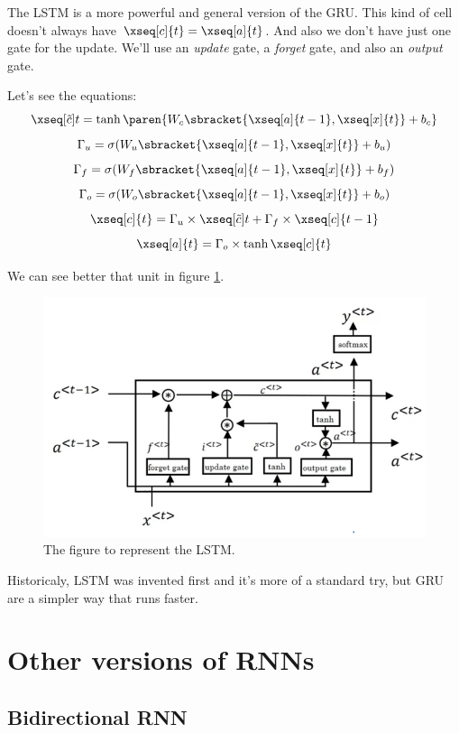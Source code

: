 \documentclass[12pt, a4paper, oneside]{book}
\begin{document}
The LSTM is a more powerful and general version of the GRU. This kind of cell
doesn't always have $\xseq[c]{t}=\xseq[a]{t}$. And also we don't have just one
gate for the update. We'll use an \textit{update} gate, a \textit{forget} gate,
and also an \textit{output} gate.

Let's see the equations:
\[
\xseq[\tilde{c}]{t}=\tanh\paren{W_{c}\sbracket{\xseq[a]{t-1},\xseq[x]{t}}+b_c}
\]
\[
\Gamma_u=\sigma(W_u\sbracket{\xseq[a]{t-1},\xseq[x]{t}}+b_u)
\]
\[
\Gamma_f=\sigma(W_f\sbracket{\xseq[a]{t-1},\xseq[x]{t}}+b_f)
\]
\[
\Gamma_o=\sigma(W_o\sbracket{\xseq[a]{t-1},\xseq[x]{t}}+b_o)
\]
\[
\xseq[c]{t}=\Gamma_u\times\xseq[\tilde{c}]{t}+\Gamma_f\times\xseq[c]{t-1}
\]
\[
\xseq[a]{t}=\Gamma_o\times\tanh\xseq[c]{t}
\]

We can see better that unit in figure \ref{LSTM.jpg}.

\begin{figure}[h]
\centering
\includegraphics[scale=0.4]{Res/LSTM.jpg}
\caption{The figure to represent the LSTM.}
\label{LSTM.jpg}
\end{figure}

Historicaly, LSTM was invented first and it's more of a standard try, but GRU
are a simpler way that runs faster.

\section{Other versions of RNNs}%
\label{sec:other_versions_of_rnns}

\subsection{Bidirectional RNN}%
\label{sub:bidirectional_rnn}
\end{document}
